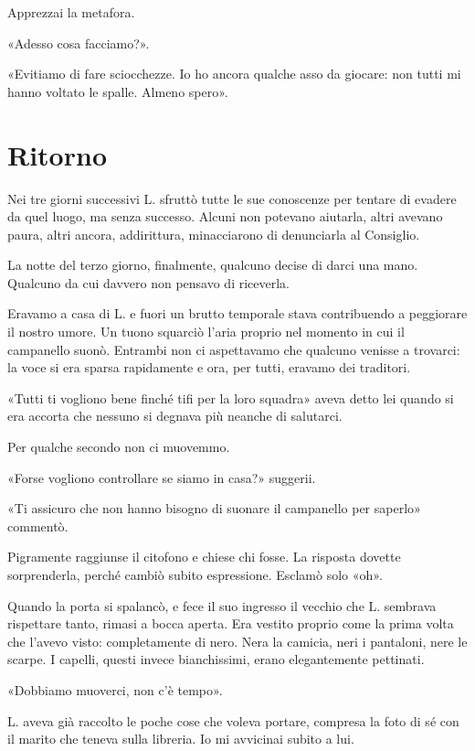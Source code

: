 \documentclass[a4paper,10pt]{memoir}
\begin{document}
Apprezzai la metafora.

«Adesso cosa facciamo?».

«Evitiamo di fare sciocchezze. Io ho ancora qualche asso da giocare: non tutti mi hanno voltato le spalle. Almeno
spero».

\chapter{Ritorno}

Nei tre giorni successivi L. sfruttò tutte le sue conoscenze per tentare di evadere da quel luogo, ma senza successo.
Alcuni non potevano aiutarla, altri avevano paura, altri ancora, addirittura, minacciarono di denunciarla al Consiglio.

La notte del terzo giorno, finalmente, qualcuno decise di darci una mano. Qualcuno da cui davvero non pensavo di
riceverla.

Eravamo a casa di L. e fuori un brutto temporale stava contribuendo a peggiorare il nostro umore. Un tuono squarciò
l'aria proprio nel momento in cui il campanello suonò. Entrambi non ci aspettavamo che qualcuno venisse a trovarci: la
voce si era sparsa rapidamente e ora, per tutti, eravamo dei traditori.

«Tutti ti vogliono bene finché tifi per la loro squadra» aveva detto lei quando si era accorta che nessuno si degnava
più neanche di salutarci.

Per qualche secondo non ci muovemmo.

«Forse vogliono controllare se siamo in casa?» suggerii.

«Ti assicuro che non hanno bisogno di suonare il campanello per saperlo» commentò.

Pigramente raggiunse il citofono e chiese chi fosse. La risposta dovette sorprenderla, perché cambiò subito espressione.
Esclamò solo «oh».

Quando la porta si spalancò, e fece il suo ingresso il vecchio che L. sembrava rispettare tanto, rimasi a bocca aperta.
Era vestito proprio come la prima volta che l'avevo visto: completamente di nero. Nera la camicia, neri i pantaloni,
nere le scarpe. I capelli, questi invece bianchissimi, erano elegantemente pettinati.

«Dobbiamo muoverci, non c'è tempo».

L. aveva già raccolto le poche cose che voleva portare, compresa la foto di sé con il marito che teneva sulla libreria.
Io mi avvicinai subito a lui.
\end{document}
